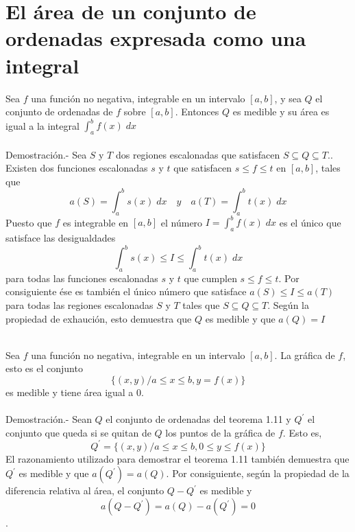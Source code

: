 \section{El área de un conjunto de ordenadas expresada como una integral}

\begin{teo}
    Sea $f$ una función no negativa, integrable en un intervalo $[a,b]$, y sea $Q$ el conjunto de ordenadas de $f$ sobre $[a,b]$. Entonces $Q$ es medible y su área es igual a la integral $\int_a^b f(x) \; dx$\\\\
    Demostración.-\; Sea $S$ y $T$ dos regiones escalonadas que satisfacen $S\subseteq Q \subseteq T.$. Existen dos funciones escalonadas $s$ y $t$ que satisfacen $s\leq f\leq t$ en $[a,b]$, tales que $$a(S)=\int_a^b s(x) \; dx \quad y \quad a(T)=\int_a^b t(x) \; dx$$
    Puesto que $f$ es integrable en $[a,b]$ el número $I=\int_a^b f(x) \; dx$ es el único que satisface las desigualdades $$\int_a^b s(x) \leq I \leq \int_a^b t(x) \; dx$$
    para todas las funciones escalonadas $s$ y $t$ que cumplen $s\leq f \leq t$. Por consiguiente ése es también el único número que satisface $a(S)\leq I \leq a(T)$ para todas las regiones escalonadas $S$ y $T$ tales que $S\subseteq Q \subseteq T.$ Según la propiedad de exhaución, esto demuestra que $Q$ es medible y que $a(Q)=I$\\\\
\end{teo}

\begin{teo}
    Sea $f$ una función no negativa, integrable en un intervalo $[a,b]$. La gráfica de $f$, esto es el conjunto $$\lbrace (x,y)/a\leq x \leq b, y=f(x) \rbrace$$ es medible y tiene área igual a $0$.\\\\
    Demostración.-\; Sean $Q$ el conjunto de ordenadas del teorema 1.11 y $Q^{'}$ el conjunto que queda si se quitan de $Q$ los puntos de la gráfica de $f$. Esto es, $$Q^{'} = \lbrace (x,y)/a\leq x \leq b, 0\leq y \leq f(x)\rbrace$$
    El razonamiento utilizado para demostrar el teorema 1.11 también demuestra que $Q^{'}$ es medible y que $a(Q^{'}) = a(Q)$. Por consiguiente, según la propiedad de la diferencia relativa al área, el conjunto $Q-Q^{'}$ es medible y $$a(Q-Q^{'})=a(Q)-a(Q^{'})=0$$.\\
\end{teo}


